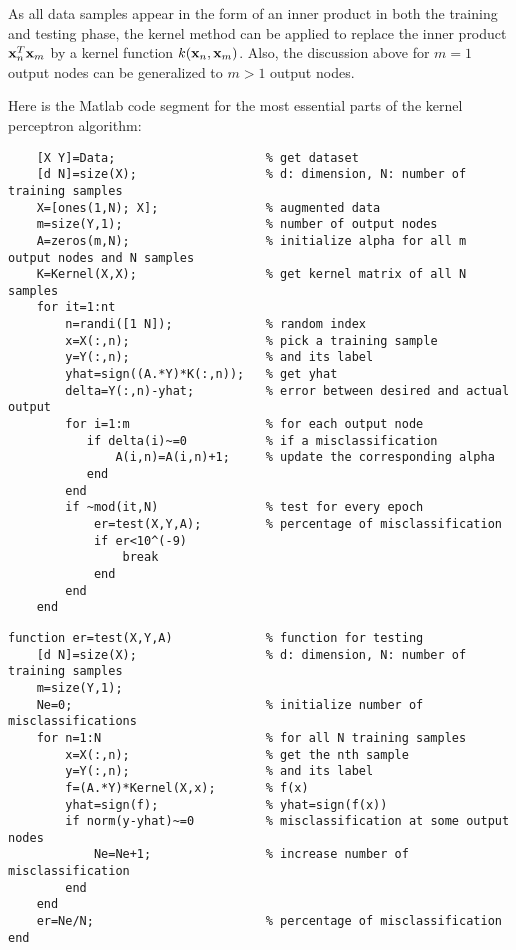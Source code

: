 \documentclass{article}
\begin{document}
As all data samples appear in the form of an inner product in both 
the training and testing phase, the kernel method can be applied to 
replace the inner product ${\bf x}_n^T{\bf x}_m$ by a kernel function 
$k({\bf x}_n,{\bf x}_m)$. Also, the discussion above for $m=1$ output
nodes can be generalized to $m>1$ output nodes.

Here is the Matlab code segment for the most essential parts of the 
kernel perceptron algorithm:

\begin{verbatim}
    [X Y]=Data;                     % get dataset
    [d N]=size(X);                  % d: dimension, N: number of training samples
    X=[ones(1,N); X];               % augmented data
    m=size(Y,1);                    % number of output nodes
    A=zeros(m,N);                   % initialize alpha for all m output nodes and N samples
    K=Kernel(X,X);                  % get kernel matrix of all N samples
    for it=1:nt                     
        n=randi([1 N]);             % random index
        x=X(:,n);                   % pick a training sample     
        y=Y(:,n);                   % and its label
        yhat=sign((A.*Y)*K(:,n));   % get yhat
        delta=Y(:,n)-yhat;     	    % error between desired and actual output
        for i=1:m                   % for each output node
           if delta(i)~=0           % if a misclassification
               A(i,n)=A(i,n)+1;     % update the corresponding alpha
           end
        end    
        if ~mod(it,N)               % test for every epoch
            er=test(X,Y,A);         % percentage of misclassification
            if er<10^(-9)           
                break
            end
        end
    end
\end{verbatim}


\begin{verbatim}
function er=test(X,Y,A)             % function for testing
    [d N]=size(X);                  % d: dimension, N: number of training samples
    m=size(Y,1);
    Ne=0;                           % initialize number of misclassifications
    for n=1:N                       % for all N training samples
        x=X(:,n);                   % get the nth sample
        y=Y(:,n);                   % and its label
        f=(A.*Y)*Kernel(X,x);       % f(x)
        yhat=sign(f);               % yhat=sign(f(x))
        if norm(y-yhat)~=0          % misclassification at some output nodes 
            Ne=Ne+1;                % increase number of misclassification
        end
    end
    er=Ne/N;                        % percentage of misclassification
end
\end{verbatim}
\end{document}
